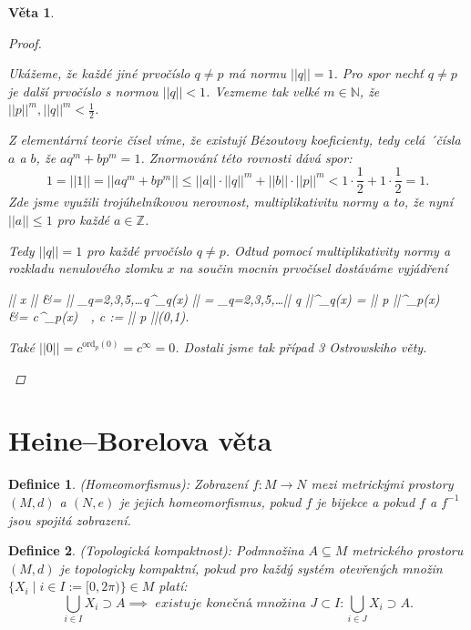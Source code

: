 \documentclass[10pt,a4paper]{article}
\newcommand{\Z}{{\mathbb{Z}}}       %
\newcommand{\N}{{\mathbb{N}}}       %
\newcommand{\half}{{\frac{1}{2}}}   %
\newcommand{\ord}{\text{ord}}   	%
\newcommand{\norm}[1]{\left|\left| #1 \right|\right|}	%
\newtheorem*{thm}{Věta}
\newtheorem{Def}{Definice}[section]
\begin{document}
\begin{thm}
\begin{proof}
\begin{itemize}
			Ukážeme, že každé jiné prvočíslo $q \neq p$ má normu $\norm{q} = 1$. 
			Pro spor nechť $q \neq p$ je další prvočíslo s normou $\norm{q} < 1$. 
			Vezmeme tak velké $m \in \N$, že $\norm{p}^m, \norm{q}^m < \half$. 
			
			Z elementární teorie čísel víme, že existují Bézoutovy koeficienty, tedy celá ´čísla $ a $ a $ b $, že $aq^m + bp^m = 1$. 
			Znormování této rovnosti dává spor:
			\[
				1 = \norm{1} = \norm{aq^m+bp^m} \leq \norm{a}\cdot \norm{q}^m + \norm{b}\cdot \norm{p}^m < 1 \cdot \half + 1 \cdot \half = 1.
			\]
			Zde jsme využili trojúhelníkovou nerovnost, multiplikativitu normy a to, že nyní $\norm{a} \leq 1$ pro každé $a \in \Z$.
			
			Tedy $\norm{q} = 1$ pro každé prvočíslo $q\neq p$. 
			Odtud pomocí multiplikativity normy a rozkladu nenulového zlomku $ x $ na součin mocnin prvočísel dostáváme vyjádření
			\begin{flalign*}
				\norm{x} &= \norm{\prod_{q=2,3,5,\ldots}q^{\ord_q(x)}} = \prod_{q=2,3,5,\ldots}\norm{q}^{\ord_q(x)} = \norm{p}^{\ord_p(x)}\\
					&= c^{\ord_p(x)}~~, \qquad {} c := \norm{p}\in (0,1).
			\end{flalign*}
			Také $\norm{0} = c^{\ord_p(0)} = c^{\infty} = 0$. Dostali jsme tak \textit{případ 3} Ostrowskiho věty. 
		\end{itemize}
	\end{proof}
\end{thm}


\section{Heine–Borelova věta}

\begin{Def} (Homeomorfismus): \normalfont
	Zobrazení $f : M \to N$ mezi metrickými prostory $(M, d)$ a $(N, e)$ je jejich \textit{homeomorfismus}, pokud $f$ je bijekce a pokud $f$ a $f^{-1}$ jsou spojitá zobrazení.
\end{Def}

\begin{Def} (Topologická kompaktnost): \normalfont
	Podmnožina $A \subseteq M$ metrického prostoru $(M, d)$ je \textit{topologicky kompaktní},
	pokud pro každý systém otevřených množin $\{X_i \mid i \in I:= [0, 2\pi)\} \in M$ platí: \[
		\bigcup_{i \in I} X_i \supset A \implies \textit{ existuje konečná množina } J \subset I: \bigcup_{i \in J} X_i \supset A.
	\]
\end{Def}
\end{document}
